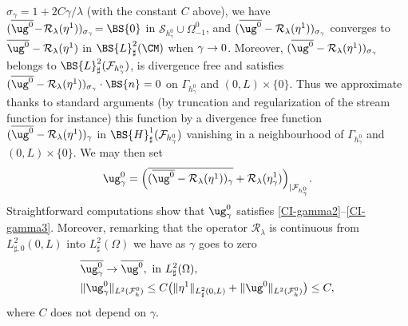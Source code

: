 $\sigma_{\gamma}\!=\!1+ 2C\gamma/\lambda$ (with the constant $C$ above), we have \hbox{$(\overline{\ug^{0}}\!-\!\mathcal{R}_\lambda(\eta^1))_{\sigma_\gamma}\!=\BS{0}$} in $\mathcal{S}_{h_\gamma^0}\cup \Omega_{-1}^0$, and $(\overline{\ug^{0}}-\mathcal{R}_\lambda(\eta^1))_{\sigma_\gamma}$ converges to $\overline{\ug^{0}}-\mathcal{R}_\lambda(\eta^1)$ in $\BS{L}_\sharp^2(\CM)$ when $\gamma \to\nobreak 0$. Moreover, $(\overline{\ug^{0}}-\mathcal{R}_\lambda(\eta^1))_{\sigma_\gamma}$ belongs to $\BS{L}^2_{\sharp}(\mathcal{F}_{h_\gamma^0})$, is divergence free and satisfies $(\overline{\ug^{0}}-\mathcal{R}_\lambda(\eta^1))_{\sigma_\gamma}\cdot\BS{n} =0$ on $\Gamma_{h^0_\gamma}$ and $(0, L)\times\{0\}$. Thus we approximate thanks to standard arguments (by truncation and regularization of the stream function for instance) this function by a divergence free function $(\overline{\ug^{0}}-\mathcal{R}_\lambda(\eta^1))_{\gamma}$ in $\BS{H}^1_{\sharp}(\mathcal{F}_{h_\gamma^0})$ vanishing in a neighbourhood of $\Gamma_{h^0_\gamma}$ and $(0, L)\times\{0\}$. We may then set
\[
\ug_{\gamma}^0 = \Bigl( \overline{(\overline{\ug^{0}}-\mathcal{R}_\lambda(\eta^1))_{\gamma} }+\mathcal{R}_\lambda(\eta_\gamma^1)\Bigr)_{|{\mathcal{F}_{h_\gamma^0}}}.
\]
Straightforward computations show that $\ug_{\gamma}^0$ satisfies \eqref{CI-gamma2}--\eqref{CI-gamma3}. Moreover,
remarking that the operator $\mathcal R_{\lambda}$ is continuous from $L^2_{\sharp,0}(0,L)$ into $L_\sharp^2(\Omega)$ we have as $\gamma$ goes to zero
\begin{align*}
& \overline{\ug^0_\gamma}\to \overline{\ug^0}, \text{ in }L^2_\sharp(\Omega),\\
& \| \ug^0_\gamma \|_{{L}^2(\mathcal F^0_{h})}\leq C\bigl( \|\eta^1\|_{L^2_\sharp(0, L)} + \|\ug^0\|_{L^2(\mathcal F_h^0)} \bigr)\leq C,
\end{align*}
where $C$ does not depend on $\gamma$.


